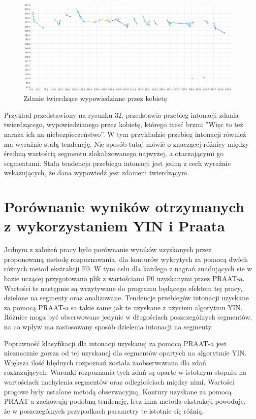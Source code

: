 \documentclass[a4paper,12 pt]{report}
\begin{document}
\begin{figure}[h]
\centering
\includegraphics[scale=0.7]{twierdzenie_3_kobieta.png}
\caption{Zdanie twierdzące wypowiedziane przez kobietę}
\end{figure}
\FloatBarrier
Przykład przedstawiony na rysunku 32, przedstawia przebieg intonacji zdania twierdzącego, wypowiedzianego przez kobietę, którego tresć brzmi ''Więc to też naraża ich na niebezpieczeństwo''. W tym przykładzie przebieg intonacji również ma wyraźnie stałą tendencję. Nie sposób tutaj mówić o znaczącej różnicy między średnią wartością segmentu zlokalizowanego najwyżej, a otaczającymi go segmentami. Stała tendencja przebiegu intonacji jest jedną z cech wyraźnie wskazujących, że dana wypowiedź jest zdaniem twierdzącym.

 
\section{Porównanie wyników otrzymanych z wykorzystaniem YIN i Praata}
Jednym z założeń pracy było porównanie wyników uzyskanych przez proponowaną metodę rozpoznawania, dla konturów wykrytych za pomocą dwóch różnych metod ekstrakcji F0. W tym celu dla każdego z nagrań znadujących sie w bazie uczącej przygotowano plik z wartościami F0 uzyskanymi przez PRAAT-a. Wartości te następnie są wczytywane do programu będącego efektem tej pracy, dzielone na segmenty oraz analizowane.
Tendencje przebiegów intonacji uzyskane za pomocą PRAAT-a sa takie same jak te uzyskane z użyciem algorytmu YIN. Różnice moga być obserwowane jedynie w długościach poszczególnych segmentów, na co wpływ ma zastosowany sposób dzielenia intonacji na segmenty.


Poprawność klasyfikacji dla intonacji uzyskanej za pomocą PRAAT-a jest nieznacznie gorsza od tej uzyskanej dla segmentów opartych na algorytmie YIN. Większa ilość błędnych rozpoznań została zaobserwowana dla zdań rozkazujących. Warunki rozpoznania tych zdań są oparte w istotnym stopniu na wartościach nachylenia segmentów oraz odległościach między nimi. Wartości progowe były ustalone metodą obserwacyjną. Kontury uzyskane za pomocą PRAAT-a zachowują podobną tendencję, lecz inna metoda ekstrakcji powoduje, że w poszczególnych przypadkach parametry te istotnie się różnią.
\end{document}
